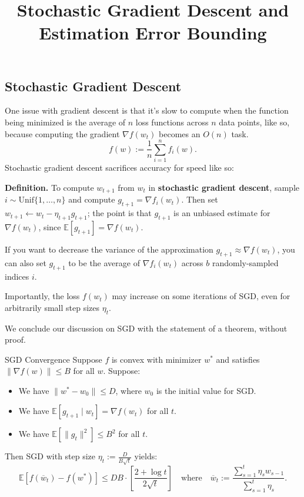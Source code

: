 \title{Stochastic Gradient Descent and Estimation Error Bounding}



\subsection{Stochastic Gradient Descent}

One issue with gradient descent is that
it's slow to compute when the function being minimized
is the average of $n$ loss functions across $n$ data points,
like so, because computing the gradient $\nabla f(w_t)$
becomes an $O(n)$ task.
\[ f(w) := \frac{1}{n} \sum_{i = 1}^n f_i(w). \]
Stochastic gradient descent sacrifices accuracy for speed like so:

\textbf{Definition.}
To compute $w_{t + 1}$ from $w_t$ in \textbf{stochastic gradient descent},
sample $i \sim \mathrm{Unif}\{1, \dots, n\}$
and compute $g_{t + 1} = \nabla f_i(w_t)$.
Then set $w_{t + 1} \leftarrow w_t - \eta_{t + 1} g_{t + 1}$;
the point is that $g_{t + 1}$ is an
unbiased estimate for $\nabla f(w_t)$,
since $\mathbb{E}[g_{t + 1}] = \nabla f(w_t)$.

\begin{remark}
    If you want to decrease the variance of the approximation
    $g_{t + 1} \approx \nabla f(w_t)$, you can also
    set $g_{t + 1}$ to be the average of $\nabla f_i(w_t)$
    across $b$ randomly-sampled indices $i$.
\end{remark}

Importantly, the loss $f(w_t)$ may increase
on some iterations of SGD,
even for arbitrarily small step sizes $\eta_t$.

We conclude our discussion on SGD
with the statement of a theorem, without proof.

\begin{theorem}{SGD Convergence}
    Suppose $f$ is convex with minimizer $w^*$ and satisfies
    $\|\nabla f(w)\| \leq B$ for all $w$.
    Suppose:
    \begin{itemize}
        \item We have $\|w^* - w_0\| \leq D$,
        where $w_0$ is the initial value for SGD.
        \item We have $\mathbb{E}[g_{t + 1} \mid w_t] = \nabla f(w_t)$
        for all $t$.
        \item We have $\mathbb{E}\left[\|g_t\|^2\right] \leq B^2$
        for all $t$.
    \end{itemize}
    Then SGD with step size $\eta_t := \frac{D}{B\sqrt{t}}$ yields:
    \[ 
    \mathbb{E}\left[
        f(\overline{w}_t) - f(w^*)
    \right] \leq DB \cdot \left[
        \frac{2 + \log t}{2\sqrt{t}}
    \right]
    ~~~ \text{ where } ~~~
    \overline{w}_t :=
    \frac{\sum_{s = 1}^t \eta_s w_{s - 1}}{\sum_{s = 1}^t \eta_s}.
    \]
\end{theorem}

